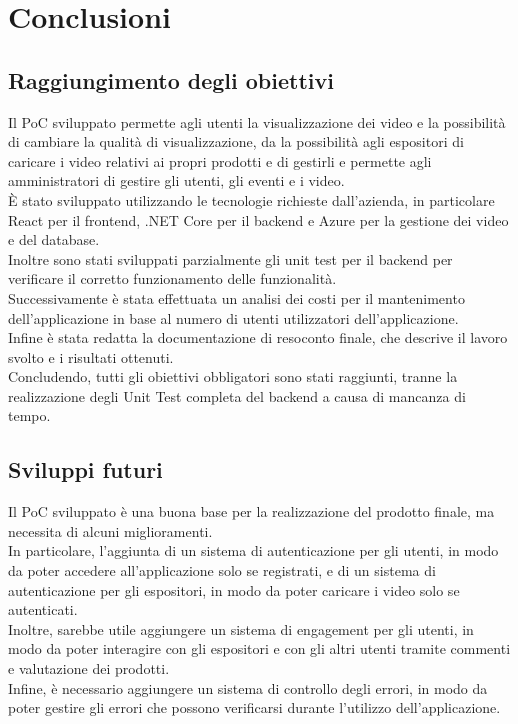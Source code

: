 \chapter{Conclusioni}
\label{cap:conclusioni}

\section{Raggiungimento degli obiettivi}
Il PoC sviluppato permette agli utenti la visualizzazione dei video e la possibilità di cambiare la qualità di visualizzazione, da la possibilità agli espositori di caricare i video relativi ai propri prodotti e di gestirli e permette agli amministratori di gestire gli utenti, gli eventi e i video.\\
È stato sviluppato utilizzando le tecnologie richieste dall'azienda, in particolare React per il frontend, .NET Core per il backend e Azure per la gestione dei video e del database.\\
Inoltre sono stati sviluppati parzialmente gli unit test per il backend per verificare il corretto funzionamento delle funzionalità.\\
Successivamente è stata effettuata un analisi dei costi per il mantenimento dell'applicazione in base al numero di utenti utilizzatori dell'applicazione.\\
Infine è stata redatta la documentazione di resoconto finale, che descrive il lavoro svolto e i risultati ottenuti.\\
Concludendo, tutti gli obiettivi obbligatori sono stati raggiunti, tranne la realizzazione degli Unit Test completa del backend a causa di mancanza di tempo.\\
\section{Sviluppi futuri}
Il PoC sviluppato è una buona base per la realizzazione del prodotto finale, ma necessita di alcuni miglioramenti.\\
In particolare, l'aggiunta di un sistema di autenticazione per gli utenti, in modo da poter accedere all'applicazione solo se registrati, e di un sistema di autenticazione per gli espositori, in modo da poter caricare i video solo se autenticati.\\
Inoltre, sarebbe utile aggiungere un sistema di engagement per gli utenti, in modo da poter interagire con gli espositori e con gli altri utenti tramite commenti e valutazione dei prodotti.\\
Infine, è necessario aggiungere un sistema di controllo degli errori, in modo da poter gestire gli errori che possono verificarsi durante l'utilizzo dell'applicazione.\\

